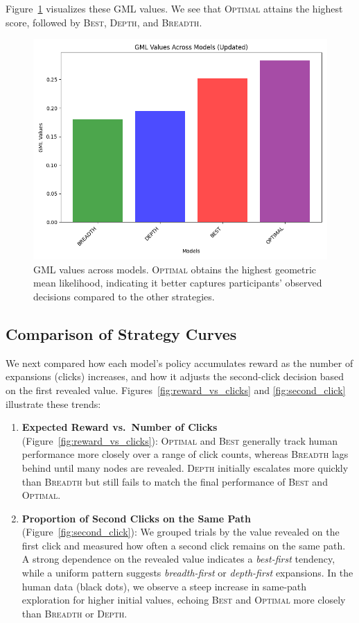 \documentclass[a4paper,12pt,oneside,article]{memoir}
\begin{document}
Figure~\ref{fig:gml_plot} visualizes these GML values. We see that \textsc{Optimal} attains the highest score, followed by \textsc{Best}, \textsc{Depth}, and \textsc{Breadth}.

\begin{figure}[h]
    \centering
    \includegraphics[width=0.6\linewidth]{image4.png}
    \caption{GML values across models. \textsc{Optimal} obtains the highest geometric mean likelihood, indicating it better captures participants' observed decisions compared to the other strategies.}
    \label{fig:gml_plot}
\end{figure}

\subsection*{Comparison of Strategy Curves}
We next compared how each model’s policy accumulates reward as the number of expansions (clicks) increases, and how it adjusts the second-click decision based on the first revealed value. Figures~\ref{fig:reward_vs_clicks} and \ref{fig:second_click} illustrate these trends:

\begin{enumerate}
    \item \textbf{Expected Reward vs.\ Number of Clicks} (Figure~\ref{fig:reward_vs_clicks}): 
    \textsc{Optimal} and \textsc{Best} generally track human performance more closely over a range of click counts, whereas \textsc{Breadth} lags behind until many nodes are revealed. \textsc{Depth} initially escalates more quickly than \textsc{Breadth} but still fails to match the final performance of \textsc{Best} and \textsc{Optimal}.

    \item \textbf{Proportion of Second Clicks on the Same Path} (Figure~\ref{fig:second_click}):
    We grouped trials by the value revealed on the first click and measured how often a second click remains on the same path. A strong dependence on the revealed value indicates a \emph{best-first} tendency, while a uniform pattern suggests \emph{breadth-first} or \emph{depth-first} expansions. In the human data (black dots), we observe a steep increase in same-path exploration for higher initial values, echoing \textsc{Best} and \textsc{Optimal} more closely than \textsc{Breadth} or \textsc{Depth}.
\end{enumerate}
\end{document}

